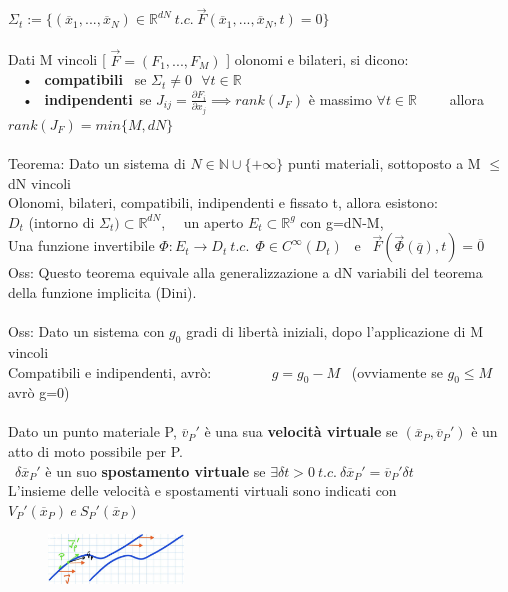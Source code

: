 \documentclass{article}
\theoremstyle{unnumbered}
\theoremstyle{unnumbered1}
\begin{document}
$\Sigma_t := \{ (\overline{x}_1, ..., \overline{x}_N) \in \mathbb{R}^{dN} \ t.c. \ \overrightarrow{F}(\overline{x}_1, ..., \overline{x}_N, t ) = 0 \}$ \\ \\
%
%
%
Dati M vincoli [ $\overrightarrow{F} = (F_1,...,F_M)$ ] olonomi e bilateri, si dicono:\\
\ \ • \ \textbf{compatibili} \ se $\Sigma_t \neq 0 \ \ \ \forall t \in \mathbb{R}$ \\
\ \ • \ \textbf{indipendenti}\ se $J_{ij}= \frac{\partial F_i}{\partial x_j} \implies rank(J_F)$ è massimo $\forall t \in \mathbb{R}$ \ \ \ \ allora $rank(J_F) = min \{ M,dN\} $ \\ \\
%
%
%
Teorema: Dato un sistema di $N\in\mathbb{N} \cup \{ +\infty \}$ punti materiali, sottoposto a M $\leq$ dN vincoli \\
\phantom{\ } Olonomi, bilateri, compatibili, indipendenti e fissato t, allora esistono: \\
\phantom{\ } $D_t$ (intorno di $\Sigma_t)\subset \mathbb{R}^{dN}$, \ \ un aperto $E_t\subset\mathbb{R}^g$ con g=dN-M, \\ 
\phantom{\ } Una funzione invertibile $\Phi : E_t \rightarrow D_t \ t.c. \ \ \Phi \in C^\infty(D_t)$ \ e \ $\overrightarrow{F}(\overrightarrow{\Phi}(\overline{q}),t) = \overline{0}$ \\
Oss: Questo teorema equivale alla generalizzazione a dN variabili del teorema della funzione implicita (Dini). \\ \\
%
%
%
Oss: Dato un sistema con $g_0$ gradi di libertà iniziali, dopo l'applicazione di M vincoli \\
\phantom{Oss: }Compatibili e indipendenti, avrò: \ \ \ \ \ \ \ \ $g=g_0-M$ \ (ovviamente se $g_0 \leq M$ avrò g=0) \\ \\
%
%
%
Dato un punto materiale P, $\overline{v}_P'$ è una sua \textbf{velocità virtuale} se $(\overline{x}_P,\overline{v}_P')$ è un atto di moto possibile per P.\\\
$\delta\overline{x}_P'$ è un suo \textbf{spostamento virtuale} se $\exists \delta t > 0 \ t.c. \ \delta\overline{x}_P' = \overline{v}_P'\delta t $\\
L'insieme delle velocità e spostamenti virtuali sono indicati con $V_P'(\overline{x}_P) \ e \ S_P'(\overline{x}_P)$ \ \ \ \ \ \ \ \ \ \ \
%
%
%
\begin{figure}
\includegraphics[width=0.32\textwidth]{Virtuali.jpeg}
\end{figure} \\
\end{document}
